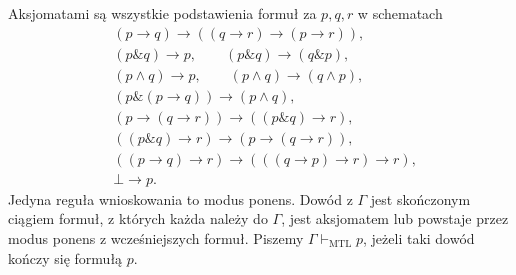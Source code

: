 \begin{definicja}\label{def:lst-fuzzy-mtl-calculus}
Aksjomatami są wszystkie podstawienia formuł za $p,q,r$ w schematach
\begin{align*}
 & (p\to q)\to((q\to r)\to(p\to r)),\\
 & (p\mathbin{\&}q)\to p, \qquad
 (p\mathbin{\&}q)\to(q\mathbin{\&}p),\\
 & (p\wedge q)\to p, \qquad
 (p\wedge q)\to(q\wedge p),\\
 & (p\mathbin{\&}(p\to q))\to(p\wedge q),\\
 & (p\to(q\to r))\to((p\mathbin{\&}q)\to r),\\
 & ((p\mathbin{\&}q)\to r)\to(p\to(q\to r)),\\
 & ((p\to q)\to r)\to(((q\to p)\to r)\to r),\\
 & \bot\to p.
\end{align*}
Jedyna reguła wnioskowania to modus ponens. Dowód z $\Gamma$ jest
skończonym ciągiem formuł, z których każda należy do $\Gamma$,
jest aksjomatem lub powstaje przez modus ponens z wcześniejszych
formuł. Piszemy $\Gamma\vdash_{\mathrm{MTL}}p$, jeżeli taki dowód
kończy się formułą $p$.
\end{definicja}

